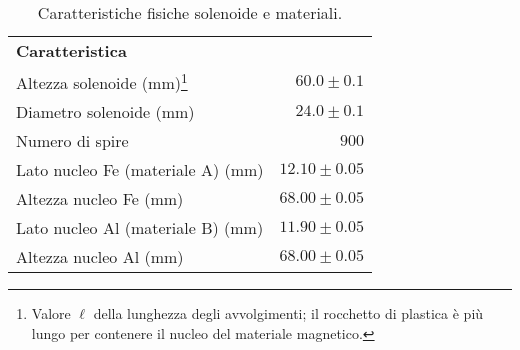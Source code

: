 \squeezetable
\begin{table}[h]
    \begin{ruledtabular}
        \caption{Caratteristiche fisiche solenoide e materiali.}
        \label{tab:L_caratt}
        \begin{tabular}{lr}
            \bf{Caratteristica} & \\
            \colrule
            Altezza solenoide (mm)\footnote{Valore $\ell$ della lunghezza degli avvolgimenti; il rocchetto di plastica è più lungo per contenere il nucleo del materiale magnetico.}              
                                                & $60.0  \pm 0.1 $ \\
            Diametro solenoide (mm)             & $24.0  \pm 0.1 $ \\
            Numero di spire                     & $900$            \\
            Lato nucleo Fe (materiale A) (mm)   & $12.10 \pm 0.05$ \\
            Altezza nucleo Fe (mm)              & $68.00 \pm 0.05$ \\
            Lato nucleo Al (materiale B) (mm)   & $11.90 \pm 0.05$ \\
            Altezza nucleo Al (mm)              & $68.00 \pm 0.05$ \\
        \end{tabular}
    \end{ruledtabular}
\end{table}